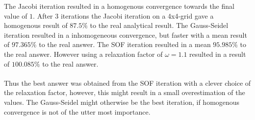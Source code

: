 \begin{answer}
    The Jacobi iteration resulted in a homogenous convergence towards the final value of $1$. After 3 iterations the Jacobi iteration on a 4x4-grid gave a homogenous result of $87.5\%$ to the real analytical result. The Gauss-Seidel iteration resulted in a inhomogeneous convergence, but faster with a mean result of $97.365\%$ to the real answer. The SOF iteration resulted in a mean $95.985\%$ to the real answer. However using a relaxation factor of $\omega=1.1$ resulted in a result of $100.085\%$ to the real answer.
    \\ \text{ } \\
    Thus the best answer was obtained from the SOF iteration with a clever choice of the relaxation factor, however, this might result in a small overestimation of the values. The Gauss-Seidel might otherwise be the best iteration, if homogenous convergence is not of the utter most importance. 
\end{answer}
